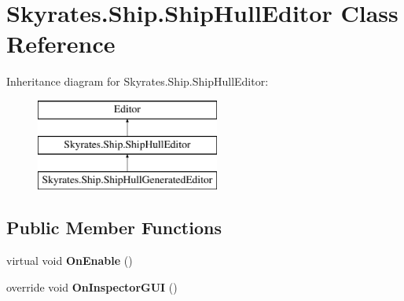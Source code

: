 \hypertarget{class_skyrates_1_1_ship_1_1_ship_hull_editor}{\section{Skyrates.\-Ship.\-Ship\-Hull\-Editor Class Reference}
\label{class_skyrates_1_1_ship_1_1_ship_hull_editor}
}
Inheritance diagram for Skyrates.\-Ship.\-Ship\-Hull\-Editor\-:\begin{figure}[H]
\begin{center}
\leavevmode
\includegraphics[height=3.000000cm]{class_skyrates_1_1_ship_1_1_ship_hull_editor}
\end{center}
\end{figure}
\subsection*{Public Member Functions}
\begin{DoxyCompactItemize}
\item 
\hypertarget{class_skyrates_1_1_ship_1_1_ship_hull_editor_a7d5f7cc7b47cf955ae18fcd7becb5f71}{virtual void {\bfseries On\-Enable} ()}\label{class_skyrates_1_1_ship_1_1_ship_hull_editor_a7d5f7cc7b47cf955ae18fcd7becb5f71}

\item 
\hypertarget{class_skyrates_1_1_ship_1_1_ship_hull_editor_a9ce58968f06631db1d66b6bc86c18473}{override void {\bfseries On\-Inspector\-G\-U\-I} ()}\label{class_skyrates_1_1_ship_1_1_ship_hull_editor_a9ce58968f06631db1d66b6bc86c18473}

\end{DoxyCompactItemize}
